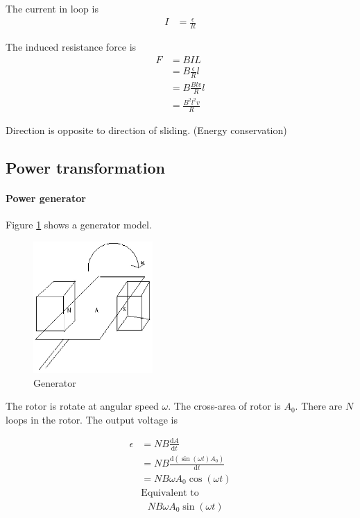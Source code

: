             The current in loop is
            \begin{align}
                I &= \frac{\epsilon}{R}
            \end{align}

            The induced resistance force is
            \begin{align}
                F &= B I L \\
                  &= B \frac{\epsilon}{R} l \\
                  &= B \frac{B l v}{R} l \\
                  &= \frac{B^2 l^2 v}{R}
            \end{align}

            Direction is opposite to direction of sliding. (Energy conservation)

    \subsection{Power transformation}
        \paragraph{Power generator}
            Figure \ref{generator} shows a generator model.

            \begin{figure}[H]
                \begin{center}
                    \includegraphics[height=5cm]{electromagnetism_charts/generator.eps}
                \end{center}
                \caption{Generator}
                \label{generator}
            \end{figure}

            The rotor is rotate at angular speed $\omega$. The cross-area of rotor is $A_0$. There are $N$ loops in the rotor. The output voltage is

            \begin{align}
                \epsilon &= N B \frac{\mathrm{d} A}{\mathrm{d} t} \\
                         &= N B \frac{\mathrm{d} (\sin (\omega t) A_0)}{\mathrm{d} t} \\
                         &= N B \omega A_0 \cos (\omega t) \\
                         & \mbox{Equivalent to} \\
                         & \ \ \ N B \omega A_0 \sin (\omega t)
            \end{align}

